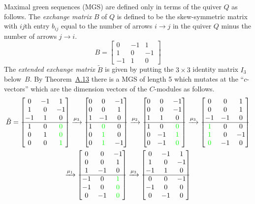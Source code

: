\documentclass[10pt]{amsart}
\theoremstyle{definition}
\newcommand{\mat}[1]{\ensuremath{
\left[\begin{matrix}#1
\end{matrix}\right]
}}
\begin{document}
Maximal green sequences (MGS) are defined only in terms of the quiver $Q$ as follows. The \emph{exchange matrix} $B$ of $Q$ is defined to be the skew-symmetric matrix with $ij$th entry $b_{ij}$ equal to the number of arrows $i\to j$ in the quiver $Q$ minus the number of arrows $j\to i$. %
\[
	B=\mat{0 & -1 & 1\\
	1 & 0 & -1\\
	-1 & 1 & 0}
\]
The \emph{extended exchange matrix} $\tilde B$ is given by putting the $3\times 3$ identity matrix $I_3$ below~$B$. By Theorem~\href{https://alco.centre-mersenne.org/articles/10.5802/alco.61/}{A.13} there is a MGS of length 5 which mutates at the \hbox{``$c$-vectors''} which are the dimension vectors of the $C$-modules as follows.
\begin{gather*}
	\tilde B=\mat{0 & -1 & 1\\
	1 & 0 & -1\\
	-1 & 1 & 0\\
	\hline %
	1 & 0 & \color{green}0\\
	0 & 1 & \color{green}0\\
	0 & 0 & \color{green}1} 
	\xrightarrow{\mu_3}
	 \mat{0 & 0 & -1\\
	0 & 0 & 1\\
	1 & -1 & 0\\
	\hline %
	1 & \color{green}0 & 0\\
	0 & \color{green}1 & 0\\
	0 & \color{green}1 & -1} 
	\xrightarrow{\mu_2} 
	 \mat{0 & 0 & -1\\
	0 & 0 & -1\\
	1 & 1 & 0\\
	\hline %
	1 & 0 & \color{green}0\\
	0 & -1 & \color{green}1\\
	0 & -1 & \color{green}0} 
	\xrightarrow{\mu_3} 
	\mat{0 & 0 & 1\\
	0 & 0 & 1\\
	-1 & -1 & 0\\
	\hline %
	\color{green}1 & 0 & 0\\
	\color{green}1 & 0 & -1\\
	\color{green}0 & -1 & 0} 
\\
	\xrightarrow{\mu_1} 
	\mat{0 & 0 & -1\\
	0 & 0 & 1\\
	1 & -1 & 0\\
	\hline %
	-1 & 0 & \color{green}1\\
	-1 & 0 & \color{green}0\\
	0 & -1 & \color{green}0}	
	\xrightarrow{\mu_3} 
	\mat{0 & -1 & 1\\
	1 & 0 & -1\\
	-1 & 1 & 0\\
	\hline %
	0 & 0 & -1\\
	-1 & 0& 0\\
	0 & -1 & 0}
\end{gather*}
\end{document}
